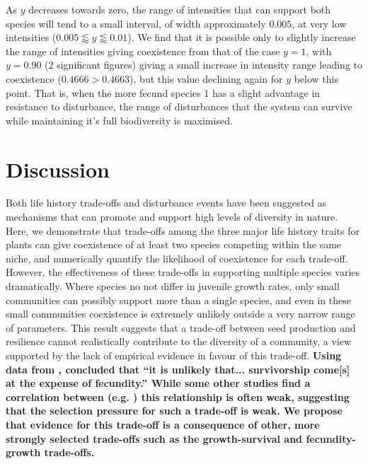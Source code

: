 As $y$ decreases towards zero, the range of intensities that can support both species will tend to a small interval, of width approximately $0.005$, at very low intensities ($0.005\lessapprox y \lessapprox 0.01$). We find that it is possible only to slightly increase the range of intensities giving coexistence from that of the case $y=1$, with $y=0.90$ (2 significant figures) giving a small increase in intensity range leading to coexistence ($0.4666>0.4663$), but this value declining again for $y$ below this point. That is, when the more fecund species 1 has a slight advantage in resistance to disturbance, the range of disturbances that the system can survive while maintaining it's full biodiversity is maximised.

\section{Discussion}
Both life history trade-offs and disturbance events have been suggested as mechanisms that can promote and support high levels of diversity in nature. Here, we demonstrate that trade-offs among the three major life history traits for plants can give coexistence of at least two species competing within the same niche, and numerically quantify the likelihood of coexistence for each trade-off. However, the effectiveness of these trade-offs in supporting multiple species varies dramatically. Where species no not differ in juvenile growth rates, only small communities can possibly support more than a single species, and even in these small communities coexistence is extremely unlikely outside a very narrow range of parameters. This result suggests that a trade-off between seed production and resilience cannot realistically contribute to the diversity of a community, a view supported by the lack of empirical evidence in favour of this trade-off. \textbf{Using data from \cite{martin2010dispersal}, \cite{martin2010divergence} concluded that ``it is unlikely that... survivorship come[s] at the expense of fecundity.'' While some other studies find a correlation between (e.g. \cite{marquis1984leaf,gwynn2005resistance}) this relationship is often weak, suggesting that the selection pressure for such a trade-off is weak. We propose that evidence for this trade-off is a consequence of other, more strongly selected trade-offs such as the growth-survival and fecundity-growth trade-offs.}

